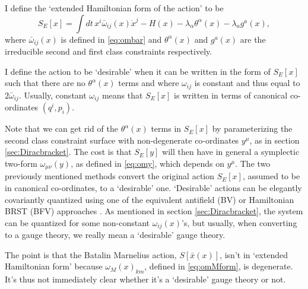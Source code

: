 \documentclass[a4paper,12pt]{article}
\theoremstyle{definition}
\theoremstyle{remark}
\numberwithin{equation}{section}
\newcommand{\al}{\alpha}
\newcommand{\la}{\lambda}
\newcommand{\om}{\omega}
\newcommand{\bx}{\bar{x}}
\newcommand{\dx}{\dot{x}}
\begin{document}
I define the `extended Hamiltonian form of the action' to be
\begin{equation} S_E[x]=\int{dt\, x^i \bar{\om}_{ij}(x) \dx^j -
H(x) -\la_{\al}\theta^{\al}(x) -\la_a g^a(x)},
\end{equation}
where $\bar{\om}_{ij}(x)$ is defined in \eqref{eq:ombar} and
$\theta^{\al}(x)$ and $g^a(x)$ are the irreducible second and first
class constraints respectively.

I define the action to be `desirable' when it can be written in the
form of $S_E[x]$ such that there are no $\theta^{\al}(x)$ terms and
where $\om_{ij}$ is constant and thus equal to $2\bar{\om}_{ij}$.
Usually, constant $\om_{ij}$ means that $S_E[x]$ is written in
terms of canonical co-ordinates $(q^i,p_i)$.

Note that we can get rid of the $\theta^{\al}(x)$ terms in
$S_E[x]$ by parameterizing the second class constraint surface
with non-degenerate co-ordinates $y^\mu$, as in section
\ref{sec:Diracbracket}. The cost is that $S_E[y]$ will then have
in general a symplectic two-form $\om_{\mu\nu}(y)$, as defined in
\eqref{eq:omy}, which depends on $y^\mu$. The two previously
mentioned methods convert the original action $S_E[x]$, assumed to
be in canonical co-ordinates, to a `desirable' one. `Desirable'
actions can be elegantly covariantly quantized using one of the
equivalent antifield (BV) or Hamiltonian BRST (BFV) approaches
\cite{Henneaux:1992ig}. As mentioned in section
\ref{sec:Diracbracket}, the system can be quantized for some
non-constant $\om_{ij}(x)$'s, but usually, when converting to a
gauge theory, we really mean a `desirable' gauge theory.

The point is that the Batalin Marnelius action, $S[\bx(x)]$, isn't
in `extended Hamiltonian form' because $\om_M(x)_{km}$, defined in
\eqref{eq:omMform}, is degenerate. It's thus not immediately
clear whether it's a `desirable' gauge theory or not.
\end{document}
